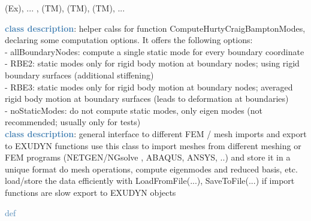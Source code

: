 \begin{itemize}[leftmargin=1.4cm]
\begin{itemize}[leftmargin=1.4cm]
\begin{itemize}[leftmargin=0.5cm]
\begin{itemize}[leftmargin=1.4cm]
\begin{itemize}[leftmargin=1.4cm]
\begin{itemize}[leftmargin=0.5cm]
 (Ex), 
 ...
, 
 (TM), 
 (TM), 
 (TM), 
 ...
\ei

%
\noindent\textcolor{steelblue}{{\bf class description}}:  helper calss for function ComputeHurtyCraigBamptonModes, declaring some computation options. It offers the following options:\\
 - allBoundaryNodes:     compute a single static mode for every boundary coordinate\\
 - RBE2:                 static modes only for rigid body motion at boundary nodes; using rigid boundary surfaces (additional stiffening)\\
 - RBE3:                 static modes only for rigid body motion at boundary nodes; averaged rigid body motion at boundary surfaces (leads to deformation at boundaries)\\
 - noStaticModes:        do not compute static modes, only eigen modes (not recommended; usually only for tests)
\vspace{3pt} \\ 
\noindent\textcolor{steelblue}{{\bf class description}}:  general interface to different FEM / mesh imports and export to EXUDYN functions
         use this class to import meshes from different meshing or FEM programs (NETGEN/NGsolve \cite{NGsolve2022}, ABAQUS, ANSYS, ..) and store it in a unique format
         do mesh operations, compute eigenmodes and reduced basis, etc.
         load/store the data efficiently with LoadFromFile(...), SaveToFile(...)  if import functions are slow
         export to EXUDYN objects
\vspace{3pt} \\ 
\begin{flushleft}
\noindent \textcolor{steelblue}{def {\bf {}}}\label{sec:FEM:FEMinterface:__init__}

\end{flushleft}
\end{itemize}
\end{itemize}
\end{itemize}
\end{itemize}
\end{itemize}
\end{itemize}
